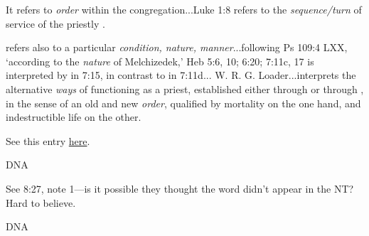 \begin{compactdesc}
					\item[EDNT 3:333, PDF 1447] \phantom{.}
						\begin{compactitem}
							\item[2] It refers to \textit{order} within the congregation...Luke 1:8 refers to the \textit{sequence/turn} of service of the priestly .
							\item[3]  refers also to a particular \textit{condition, nature, manner}...following Ps 109:4 LXX, `according to the \textit{nature} of Melchizedek,' Heb 5:6, 10; 6:20; 7:11c, 17 is interpreted by  in 7:15, in contrast to  in 7:11d... W. R. G. Loader...interprets the alternative \textit{ways} of functioning as a priest, established either through  or through , in the sense of an old and new \textit{order}, qualified by mortality on the one hand, and indestructible life on the other.
							\item See this entry \href{https://drive.google.com/file/d/1xdzDS1V5SS8b_kukGSVS9kZfrgnQmfwt/view?usp=sharing}{here}.
						\end{compactitem}
						
					\item[TDNT] \phantom{.}
						\begin{compactitem}
							\item DNA
								\begin{compactitem}
									\item See 8:27, note 1---is it possible they thought the word didn't appear in the NT? Hard to believe.
								\end{compactitem}
						\end{compactitem}
						
						
						
					\item[NIDNTTE] \phantom{.}
						\begin{compactitem}
							\item DNA
						\end{compactitem}
						
				\end{compactdesc}
		
